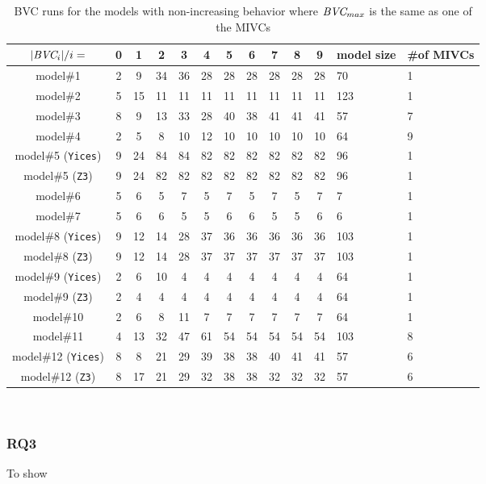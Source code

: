 \begin{table}
  \caption{BVC runs for the models with non-increasing behavior where $\textit{BVC} _{max}$ is the same as one of the MIVCs}
  \centering
  \begin{tabularx}{\linewidth}{ |c||c|c|c|c|c|c|c|c|c|c||L|L|}
    \hline
    $|\textit{BVC} _{i}| / i=$ & 0 & 1 & 2 & 3 & 4 & 5 & 6 & 7 & 8 & 9 & \small{model size} & \small{\#of MIVCs} \\[0.5ex]
    \hline\hline
    
    model\#1& 2 & 9 & 34 & 36& 28 & 28 & 28 & 28 & 28 & 28 & 70&1 \\[0.5ex]
    model\#2& 5 & 15 & 11& 11& 11 & 11 & 11 & 11 & 11 & 11 & 123 &1\\[0.5ex]
    model\#3& 8 & 9& 13& 33& 28& 40& 38& 41& 41& 41&57 &7 \\[0.5ex]
    model\#4& 2& 5& 8& 10& 12& 10& 10& 10& 10& 10 &64 &9\\[0.5ex]
    \small{model\#5 (\texttt{Yices})}&9& 24 & 84& 84& 82& 82& 82& 82& 82& 82&96 &1\\[0.5ex]
    \small{model\#5 (\texttt{Z3})}& 9& 24& 82& 82& 82& 82& 82& 82& 82& 82&96 &1\\[0.5ex]
    model\#6& 5& 6& 5& 7& 5& 7& 5& 7& 5& 7& 7 &1\\[0.5ex]
    model\#7& 5& 6& 6& 5& 5& 6& 6& 5& 5& 6&6 &1\\[0.5ex]
    \small{model\#8 (\texttt{Yices})}& 9& 12& 14& 28& 37& 36& 36& 36& 36& 36&103&1 \\[0.5ex]
    \small{model\#8 (\texttt{Z3})}&9& 12& 14& 28& 37& 37& 37& 37& 37& 37& 103&1\\[0.5ex]
    \small{model\#9 (\texttt{Yices})}& 2& 6& 10& 4& 4& 4& 4& 4& 4& 4 &64&1 \\[0.5ex]
    \small{model\#9 (\texttt{Z3})}& 2& 4& 4& 4& 4& 4& 4& 4& 4& 4 &64&1\\[0.5ex]
    model\#10& 2& 6& 8& 11& 7& 7& 7& 7& 7& 7 &64&1\\[0.5ex]
    model\#11& 4& 13& 32& 47& 61& 54& 54& 54& 54& 54 &103&8 \\[0.5ex]
 \small{model\#12 (\texttt{Yices})}& 8& 8& 21& 29& 39& 38& 38& 40& 41& 41&57&6\\[0.5ex]
  \small{model\#12 (\texttt{Z3})}& 8& 17& 21& 29& 32& 38& 38& 32& 32& 32&57&6 \\[0.5ex]
    \hline
  \end{tabularx} \\
  \label{tab:bvc-abnormal}
\end{table}
      

\vspace{0.1in}
\subsubsection{RQ3}
To show 